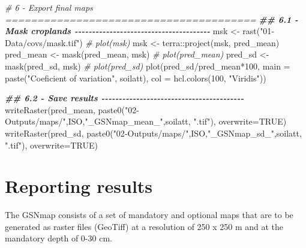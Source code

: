 \documentclass[
  10pt,
  b5paper,
  oneside]{book}
\newenvironment{Shaded}{\begin{snugshade}}{\end{snugshade}}
\newcommand{\AttributeTok}[1]{\textcolor[rgb]{0.77,0.63,0.00}{#1}}
\newcommand{\CommentTok}[1]{\textcolor[rgb]{0.56,0.35,0.01}{\textit{#1}}}
\newcommand{\ConstantTok}[1]{\textcolor[rgb]{0.00,0.00,0.00}{#1}}
\newcommand{\DecValTok}[1]{\textcolor[rgb]{0.00,0.00,0.81}{#1}}
\newcommand{\DocumentationTok}[1]{\textcolor[rgb]{0.56,0.35,0.01}{\textbf{\textit{#1}}}}
\newcommand{\FunctionTok}[1]{\textcolor[rgb]{0.00,0.00,0.00}{#1}}
\newcommand{\NormalTok}[1]{#1}
\newcommand{\OtherTok}[1]{\textcolor[rgb]{0.56,0.35,0.01}{#1}}
\newcommand{\SpecialCharTok}[1]{\textcolor[rgb]{0.00,0.00,0.00}{#1}}
\newcommand{\StringTok}[1]{\textcolor[rgb]{0.31,0.60,0.02}{#1}}
\begin{document}
\begin{Shaded}
\begin{Highlighting}[]
  \CommentTok{\# 6 {-} Export final maps =======================================}
  \DocumentationTok{\#\# 6.1 {-} Mask croplands {-}{-}{-}{-}{-}{-}{-}{-}{-}{-}{-}{-}{-}{-}{-}{-}{-}{-}{-}{-}{-}{-}{-}{-}{-}{-}{-}{-}{-}{-}{-}{-}{-}{-}{-}{-}{-}{-}{-}}
\NormalTok{  msk }\OtherTok{\textless{}{-}} \FunctionTok{rast}\NormalTok{(}\StringTok{"01{-}Data/covs/mask.tif"}\NormalTok{)}
  \CommentTok{\# plot(msk)}
\NormalTok{  msk }\OtherTok{\textless{}{-}}\NormalTok{ terra}\SpecialCharTok{::}\FunctionTok{project}\NormalTok{(msk, pred\_mean)}
\NormalTok{  pred\_mean }\OtherTok{\textless{}{-}} \FunctionTok{mask}\NormalTok{(pred\_mean, msk)}
  \CommentTok{\# plot(pred\_mean)}
\NormalTok{  pred\_sd }\OtherTok{\textless{}{-}} \FunctionTok{mask}\NormalTok{(pred\_sd, msk)}
  \CommentTok{\# plot(pred\_sd)}
  \FunctionTok{plot}\NormalTok{(pred\_sd}\SpecialCharTok{/}\NormalTok{pred\_mean}\SpecialCharTok{*}\DecValTok{100}\NormalTok{, }\AttributeTok{main =} 
         \FunctionTok{paste}\NormalTok{(}\StringTok{"Coeficient of variation"}\NormalTok{, soilatt), }
       \AttributeTok{col =} \FunctionTok{hcl.colors}\NormalTok{(}\DecValTok{100}\NormalTok{, }\StringTok{"Viridis"}\NormalTok{))}
  
  \DocumentationTok{\#\# 6.2 {-} Save results {-}{-}{-}{-}{-}{-}{-}{-}{-}{-}{-}{-}{-}{-}{-}{-}{-}{-}{-}{-}{-}{-}{-}{-}{-}{-}{-}{-}{-}{-}{-}{-}{-}{-}{-}{-}{-}{-}{-}{-}{-}}
\FunctionTok{writeRaster}\NormalTok{(pred\_mean, }
 \FunctionTok{paste0}\NormalTok{(}\StringTok{"02{-}Outputs/maps/"}\NormalTok{,ISO,}\StringTok{"\_GSNmap\_mean\_"}\NormalTok{,soilatt, }\StringTok{".tif"}\NormalTok{),}
              \AttributeTok{overwrite=}\ConstantTok{TRUE}\NormalTok{)}
\FunctionTok{writeRaster}\NormalTok{(pred\_sd, }
 \FunctionTok{paste0}\NormalTok{(}\StringTok{"02{-}Outputs/maps/"}\NormalTok{,ISO,}\StringTok{"\_GSNmap\_sd\_"}\NormalTok{,soilatt, }\StringTok{".tif"}\NormalTok{),}
 \AttributeTok{overwrite=}\ConstantTok{TRUE}\NormalTok{)}
\end{Highlighting}
\end{Shaded}

\hypertarget{reporting-results}{%
\chapter{Reporting results}\label{reporting-results}}

The GSNmap consists of a set of mandatory and optional maps that are to be generated as raster files (GeoTiff) at a resolution of 250 x 250 m and at the mandatory depth of 0-30 cm.
\end{document}
